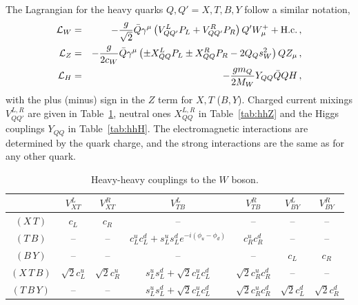 \documentclass[12pt,a4paper]{article}
\newcommand{\gm}{\gamma^\mu}
\newcommand{\Wm}{W_{\mu}}
\newcommand{\Zm}{Z_{\mu}}
\newcommand{\xt}{$(X\,T)$}
\newcommand{\tb}{$(T\,B)$}
\newcommand{\by}{$(B\,Y)$}
\newcommand{\xtb}{$(X\,T\,B)$}
\newcommand{\tby}{$(T\,B\,Y)$}
\newcommand{\slu}{s_L^u}
\newcommand{\sld}{s_L^d}
\newcommand{\clx}{c_L}
\newcommand{\clu}{c_L^u}
\newcommand{\cld}{c_L^d}
\newcommand{\crx}{c_R}
\newcommand{\cru}{c_R^u}
\newcommand{\crd}{c_R^d}
\newcommand{\sqt}{\sqrt{2}}
\begin{document}

The Lagrangian for the heavy quarks $Q,Q'=X,T,B,Y$ follow a similar notation,
\begin{eqnarray}
\mathcal{L}_W & = & -\frac{g}{\sqrt 2} \bar Q \gm \left( V_{QQ'}^L P_L + V_{QQ'}^R P_R \right) Q' \Wm^+ +\text{H.c.} \,, \notag \\ 
%
\mathcal{L}_Z & = & -\frac{g}{2 c_W} \bar Q \gm \left( \pm X_{QQ}^L P_L \pm X_{QQ}^R P_R - 2 Q_Q s_W^2 \right) Q \Zm \,, \notag \\
%
\mathcal{L}_H & = & -\frac{g m_Q}{2M_W} Y_{QQ} \bar Q Q H \,,
\label{ec:HH}
\end{eqnarray}
with the plus (minus) sign in the $Z$ term for $X,T$ ($B,Y$). Charged current mixings $V_{QQ'}^{L,R}$ are given in Table~\ref{tab:hhW}, neutral ones $X_{QQ}^{L,R}$ in Table~\ref{tab:hhZ} and the Higgs couplings $Y_{QQ}$ in Table~\ref{tab:hhH}. The electromagnetic interactions are determined by the quark charge, and the strong interactions are the same as for any other quark.




\begin{table}[htb]
\begin{center}
\begin{tabular}{c|cccccc}
& $V_{XT}^L$ & $V_{XT}^R$ & $V_{TB}^L$ & $V_{TB}^R$ & $V_{BY}^L$ & $V_{BY}^R$
\\ \hline
\xt & $\clx$ & $\crx$ & -- & -- & -- & --
\\
\tb & -- & -- & $\clu \cld + \slu \sld e^{-i (\phi_u-\phi_d)}$ & $\cru \crd$ & -- & --
\\
\by & -- & -- & -- & -- & $\clx$ & $\crx$
\\
\xtb & $\sqt \clu$ & $\sqt \cru$ & $\slu \sld + \sqt \clu \cld$ & $\sqt \cru \crd$ & -- & --
\\
\tby & -- & -- & $\slu \sld + \sqt \clu \cld$ & $\sqt \cru \crd$ & $\sqt \cld$ & $\sqt \crd$
%
\end{tabular}
\caption{Heavy-heavy couplings to the $W$ boson.}
\label{tab:hhW}
\end{center}
\end{table}
\end{document}
